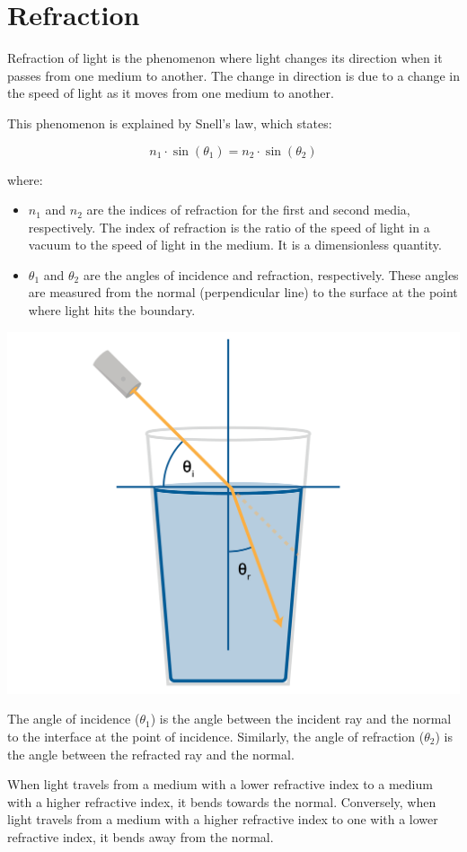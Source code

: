 \chapter{Refraction}


Refraction of light is the phenomenon where light changes its direction when it passes from one medium to another. The change in direction is due to a change in the speed of light as it moves from one medium to another. 

This phenomenon is explained by Snell's law, which states:

\begin{equation}
n_1 \cdot \sin(\theta_1) = n_2 \cdot \sin(\theta_2)
\end{equation}

where:
\begin{itemize}
\item $n_1$ and $n_2$ are the indices of refraction for the first and second media, respectively. The index of refraction is the ratio of the speed of light in a vacuum to the speed of light in the medium. It is a dimensionless quantity.
\item $\theta_1$ and $\theta_2$ are the angles of incidence and refraction, respectively. These angles are measured from the normal (perpendicular line) to the surface at the point where light hits the boundary.
\end{itemize}

\includegraphics[width=.75\textwidth]{refraction.png}

The angle of incidence ($\theta_1$) is the angle between the incident ray and the normal to the interface at the point of incidence. Similarly, the angle of refraction ($\theta_2$) is the angle between the refracted ray and the normal.

When light travels from a medium with a lower refractive index to a medium with a higher refractive index, it bends towards the normal. Conversely, when light travels from a medium with a higher refractive index to one with a lower refractive index, it bends away from the normal.

